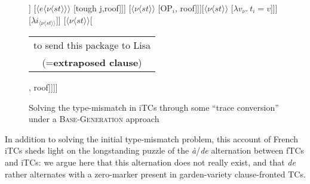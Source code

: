 \documentclass[11pt]{article}
\begin{document}
	\begin{figure}[H]
		\centering
		\begin{forest}
			[{$\langle s t \rangle$}[{$\exists v_\nu$}] [{$\langle \nu \langle s t \rangle\rangle$}[{$\langle \langle \nu \langle s t \rangle\rangle \langle \nu \langle s t \rangle\rangle\rangle$}[{$\langle \nu \langle s t \rangle\rangle$} [{$\langle \nu \langle s t \rangle\rangle$}[{$\langle \nu \langle s t \rangle\rangle$} [$\nu$ [{\begin{tabular}{c}
				t$_i$\\(=\textit{\textbf{it}})
			\end{tabular}}]] [{$\langle e \langle \nu \langle s t \rangle\rangle\rangle$} [tough j,roof]]] [{$\langle \nu \langle s t \rangle\rangle$} [{OP$_i$}, roof]]][{$\langle \nu \langle s t \rangle\rangle$} [{$\lambda v_\nu. \ t_i = v$}]]] [{$\lambda i_{\langle\nu\langle s t\rangle\rangle}$}]] [{$\langle \nu \langle s t \rangle\rangle$}[{\begin{tabular}{c}
			to send this package to Lisa\\(=\textbf{extraposed clause})
		\end{tabular}}, roof]]]]
 		\end{forest}
		\caption{Solving the type-mismatch in iTCs through some ``trace conversion'' under a \textsc{Base-Generation} approach}\label{fig:trace-conversion}
	\end{figure}
	
	 In addition to solving the initial type-mismatch problem, this account of French iTCs sheds light on the longstanding puzzle of the \textit{à}/\textit{de} alternation between fTCs and iTCs: we argue here that this alternation does not really exist, and that \textit{de} rather alternates with a zero-marker present in garden-variety clause-fronted TCs.
\end{document}
